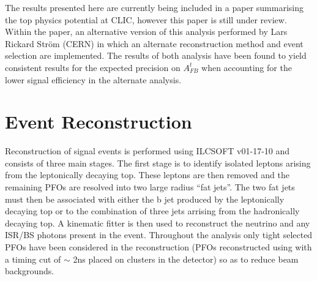 The results presented here are currently being included in a paper summarising the top physics potential at \ac{CLIC}\cite{TopPaperDraft}, however this paper is still under review. Within the paper, an alternative version of this analysis performed by Lars Rickard Str{\"o}m (CERN) in which an alternate reconstruction method and event selection are implemented. The results of both analysis have been found to yield consistent results for the expected precision on $A_{FB}^{t}$ when accounting for the lower signal efficiency in the alternate analysis.


\section{Event Reconstruction}
Reconstruction of signal events is performed using ILCSOFT v01-17-10 and consists of three main stages. The first stage is to identify isolated leptons arising from the leptonically decaying top. These leptons are then removed and the remaining PFOs are resolved into two large radius ``fat jets''. The two fat jets must then be associated with either the b jet produced by the leptonically decaying top or to the combination of three jets arrising from the hadronically decaying top. A kinematic fitter is then used to reconstruct the neutrino and any \ac{ISR}/\ac{BS} photons present in the event. Throughout the analysis only tight selected PFOs have been considered in the reconstruction (PFOs reconstructed using with a timing cut of $\sim$ 2ns placed on clusters in the detector\cite{cdrvol2}) so as to reduce beam backgrounds.

